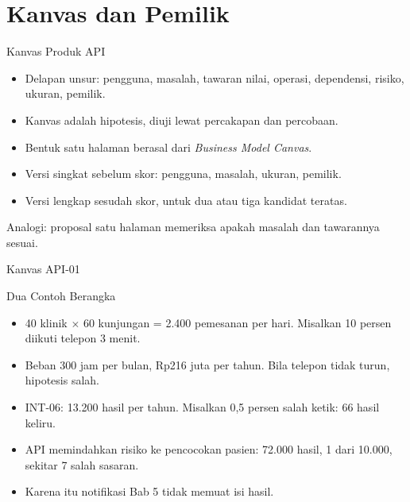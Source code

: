 \documentclass[aspectratio=169, table, 12pt]{beamer}
\begin{document}
\section{Kanvas dan Pemilik}

\begin{frame}{{\Large Kanvas Produk API}}
  \vspace{8pt}
  \begin{itemize}
    \item Delapan unsur: pengguna, masalah, tawaran nilai, operasi, dependensi, risiko, ukuran, pemilik.
    \item Kanvas adalah hipotesis, diuji lewat percakapan dan percobaan.
    \item Bentuk satu halaman berasal dari \textit{Business Model Canvas}.
    \item Versi singkat sebelum skor: pengguna, masalah, ukuran, pemilik.
    \item Versi lengkap sesudah skor, untuk dua atau tiga kandidat teratas.
  \end{itemize}
  \vspace{6pt}
  {\small Analogi: proposal satu halaman memeriksa apakah masalah dan tawarannya sesuai.}
\end{frame}

\begin{frame}{{\Large Kanvas API-01}}
  \centering
\end{frame}

\begin{frame}{{\Large Dua Contoh Berangka}}
  \vspace{8pt}
  \begin{itemize}
    \item 40 klinik $\times$ 60 kunjungan = 2.400 pemesanan per hari. Misalkan 10 persen diikuti telepon 3 menit.
    \item Beban 300 jam per bulan, Rp216 juta per tahun. Bila telepon tidak turun, hipotesis salah.
    \item INT-06: 13.200 hasil per tahun. Misalkan 0,5 persen salah ketik: 66 hasil keliru.
    \item API memindahkan risiko ke pencocokan pasien: 72.000 hasil, 1 dari 10.000, sekitar 7 salah sasaran.
    \item Karena itu notifikasi Bab 5 tidak memuat isi hasil.
  \end{itemize}
\end{frame}
\end{document}
